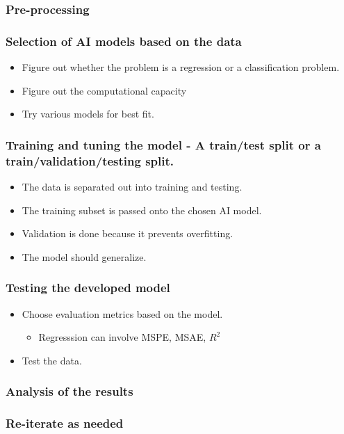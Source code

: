 \documentclass[11pt]{article}
\begin{document}
\subsubsection{Pre-processing}
\label{sec:orgb7a8dc5}
\subsubsection{Selection of AI models based on the data}
\label{sec:org65927d4}
\begin{itemize}
\item Figure out whether the problem is a regression or a classification problem.
\item Figure out the computational capacity
\item Try various models for best fit.
\end{itemize}
\subsubsection{Training and tuning the model - A train/test split or a train/validation/testing split.}
\label{sec:org2384a0e}
\begin{itemize}
\item The data is separated out into training and testing.
\item The training subset is passed onto the chosen AI model.
\item Validation is done because it prevents overfitting.
\item The model should generalize.
\end{itemize}
\subsubsection{Testing the developed model}
\label{sec:orgbb8d63b}
\begin{itemize}
\item Choose evaluation metrics based on the model.
\begin{itemize}
\item Regresssion can involve MSPE, MSAE, \(R^2\)
\end{itemize}
\item Test the data.
\end{itemize}
\subsubsection{Analysis of the results}
\label{sec:org4684087}
\subsubsection{Re-iterate as needed}
\label{sec:org4b5c399}
\end{document}
